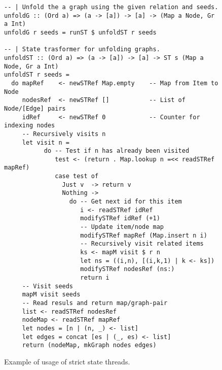 \begin{figure}[ht]
\begin{cframed}{\textwidth}
\begin{lstlisting}[language=GHC]
-- | Unfold the a graph using the given relation and seeds.
unfoldG :: (Ord a) => (a -> [a]) -> [a] -> (Map a Node, Gr a Int)
unfoldG r seeds = runST $ unfoldST r seeds

-- | State trasformer for unfolding graphs.
unfoldST :: (Ord a) => (a -> [a]) -> [a] -> ST s (Map a Node, Gr a Int)
unfoldST r seeds =
  do mapRef    <- newSTRef Map.empty    -- Map from Item to Node
     nodesRef  <- newSTRef []           -- List of Node/[Edge] pairs
     idRef     <- newSTRef 0            -- Counter for indexing nodes
     -- Recursively visits n
     let visit n = 
           do -- Test if n has already been visited
              test <- (return . Map.lookup n =<< readSTRef mapRef)
              case test of
                Just v  -> return v
                Nothing -> 
                  do -- Get next id for this item
                     i <- readSTRef idRef
                     modifySTRef idRef (+1)
                     -- Update item/node map
                     modifySTRef mapRef (Map.insert n i)
                     -- Recursively visit related items
                     ks <- mapM visit $ r n 
                     let ns = ((i,n), [(i,k,1) | k <- ks])
                     modifySTRef nodesRef (ns:)
                     return i
     -- Visit seeds
     mapM visit seeds
     -- Read resuls and return map/graph-pair
     list <- readSTRef nodesRef         
     nodeMap <- readSTRef mapRef
     let nodes = [n | (n, _) <- list]
     let edges = concat [es | (_, es) <- list]
     return (nodeMap, mkGraph nodes edges)
\end{lstlisting}  
\end{cframed}
\caption{Example of usage of strict state threads.}
\label{fig:st}
\end{figure}
\clearpage